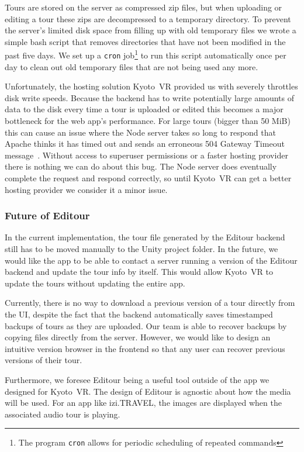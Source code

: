 \documentclass[a4paper, 10pt, american, titlepage]{article}
\begin{document}
Tours are stored on the server as compressed zip files, but when uploading or
editing a tour these zips are decompressed to a temporary directory. To prevent
the server's limited disk space from filling up with old temporary files we
wrote a simple bash script that removes directories that have not been modified
in the past five days. We set up a \texttt{cron} job\footnote{The program
\texttt{cron} allows for periodic scheduling of repeated commands} to run this
script automatically once per day to clean out old temporary files that are not
being used any more.

Unfortunately, the hosting solution Kyoto~VR provided us with severely throttles
disk write speeds. Because the backend has to write potentially large amounts of
data to the disk every time a tour is uploaded or edited this becomes a major
bottleneck for the web app's performance. For large tours (bigger than 50 MiB)
this can cause an issue where the Node server takes so long to respond that
Apache thinks it has timed out and sends an erroneous 504 Gateway Timeout
message~\autocite{rfc7231}. Without access to superuser permissions or a faster
hosting provider there is nothing we can do about this bug. The Node server does
eventually complete the request and respond correctly, so until Kyoto~VR can get
a better hosting provider we consider it a minor issue.

\subsubsection{Future of Editour}
\label{sec:futureOfEditour}

In the current implementation, the tour file generated by the Editour backend
still has to be moved manually to the Unity project folder. In the future, we
would like the app to be able to contact a server running a version of the
Editour backend and update the tour info by itself. This would allow Kyoto~VR to
update the tours without updating the entire app.

Currently, there is no way to download a previous version of a tour directly
from the UI, despite the fact that the backend automatically saves timestamped
backups of tours as they are uploaded. Our team is able to recover backups by
copying files directly from the server. However, we would like to design an
intuitive version browser in the frontend so that any user can recover previous
versions of their tour.

Furthermore, we foresee Editour being a useful tool outside of the app we
designed for Kyoto~VR. The design of Editour is agnostic about how the media
will be used. For an app like izi.TRAVEL, the images are displayed when the
associated audio tour is playing.
\end{document}
